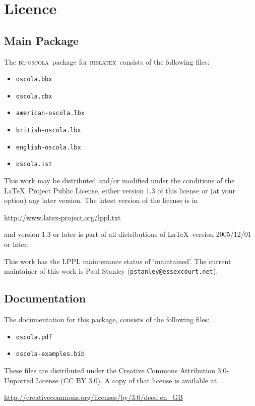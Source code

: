 \documentclass[a4paper,
               11pt,
	       DIV=1,			   
	       footinclude=false]
	      {scrartcl}
\newcommand{\oscola}{\textsc{bl-oscola}}
\newcommand{\biblatex}{\textsc{biblatex}}
\begin{document}
\clearpage

\appendix
{}
{}

\section{Licence}

\subsection{Main Package}

The \oscola\ package for \biblatex\ consists of the following files:
\begin{itemize}
\item \texttt{oscola.bbx}
\item \texttt{oscola.cbx}
\item \texttt{american-oscola.lbx}
\item \texttt{british-oscola.lbx}
\item \texttt{english-oscola.lbx}
\item \texttt{oscola.ist}
\end{itemize}

This work may be distributed and\slash or modified under the conditions of the \LaTeX\ Project Public License, either version 1.3 of this license or (at your option) any later version. The latest version of the license is in
\begin{center}
\url{http://www.latex-project.org/lppl.txt}
\end{center}
and version 1.3 or later is part of all distributions of \LaTeX\ version 2005\slash 12\slash 01 or later.

This work has the LPPL maintenance status of `maintained'. The current maintainer of this work is Paul Stanley (\texttt{pstanley@essexcourt.net}).

\subsection{Documentation}

The documentation for this package, consists of the following files:
\begin{itemize}
\item \texttt{oscola.pdf}
\item \texttt{oscola-examples.bib}
\end{itemize}

These files are distributed under the Creative Commons Attribution 3.0-Unported License (CC BY 3.0). A copy of that license is available at
\begin{center}
\url{http://creativecommons.org/licenses/by/3.0/deed.en_GB}
\end{center}
\end{document}
